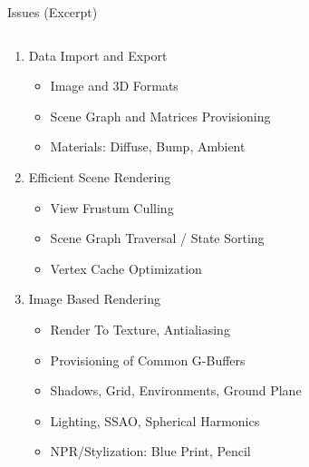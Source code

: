 \begin{frame}{Issues (Excerpt)}

	\center
	\small

	\begin{columns}[t]
		\begin{column}{0.5\textwidth}

			\pause
			\begin{enumerate}

				\item Data Import and Export
					\begin{itemize}\scriptsize
						\item Image and 3D Formats
						\item Scene Graph and Matrices Provisioning%
						\item Materials: Diffuse, Bump, Ambient %
					\end{itemize}

				\pause
				\item Efficient Scene Rendering
					\begin{itemize}\scriptsize
						\item View Frustum Culling
						\item Scene Graph Traversal / State Sorting
						\item Vertex Cache Optimization
					\end{itemize}

				\pause
				\item Image Based Rendering
					\begin{itemize}\scriptsize
						\item Render To Texture, Antialiasing
						\item Provisioning of Common G-Buffers
						\item Shadows, Grid, Environments, Ground Plane
						\item Lighting, SSAO, Spherical Harmonics
						\item NPR/Stylization: Blue Print, Pencil
					\end{itemize}

			\end{enumerate}

		\end{column}
		\begin{column}{0.5\textwidth}

			\begin{enumerate}
				\setcounter{enumi}{3}
			

\end{enumerate}
\end{column}
\end{columns}
\end{frame}
